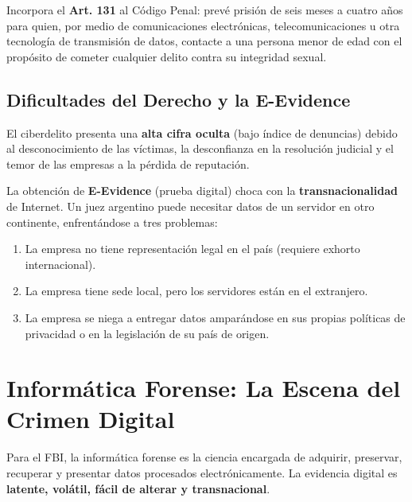 \documentclass[11pt,a4paper]{article}
\begin{document}
\begin{ley}
Incorpora el \textbf{Art. 131} al Código Penal: prevé prisión de seis meses a cuatro años para quien, por medio de comunicaciones electrónicas, telecomunicaciones u otra tecnología de transmisión de datos, contacte a una persona menor de edad con el propósito de cometer cualquier delito contra su integridad sexual.
\end{ley}

\subsection{Dificultades del Derecho y la E-Evidence}
El ciberdelito presenta una \textbf{alta cifra oculta} (bajo índice de denuncias) debido al desconocimiento de las víctimas, la desconfianza en la resolución judicial y el temor de las empresas a la pérdida de reputación.

La obtención de \textbf{E-Evidence} (prueba digital) choca con la \textbf{transnacionalidad} de Internet. Un juez argentino puede necesitar datos de un servidor en otro continente, enfrentándose a tres problemas:
\begin{enumerate}
  \item La empresa no tiene representación legal en el país (requiere exhorto internacional).
  \item La empresa tiene sede local, pero los servidores están en el extranjero.
  \item La empresa se niega a entregar datos amparándose en sus propias políticas de privacidad o en la legislación de su país de origen.
\end{enumerate}

\section{Informática Forense: La Escena del Crimen Digital}
Para el FBI, la informática forense es la ciencia encargada de adquirir, preservar, recuperar y presentar datos procesados electrónicamente. La evidencia digital es \textbf{latente, volátil, fácil de alterar y transnacional}.
\end{document}
